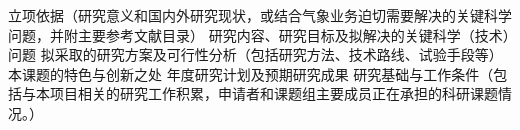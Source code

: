 \expandafter\def\csname XJSectionTitle1\endcsname{立项依据（研究意义和国内外研究现状，或结合气象业务迫切需要解决的关键科学问题，并附主要参考文献目录）}
\expandafter\def\csname XJSectionTitle2\endcsname{研究内容、研究目标及拟解决的关键科学（技术）问题}
\expandafter\def\csname XJSectionTitle3\endcsname{拟采取的研究方案及可行性分析（包括研究方法、技术路线、试验手段等）}
\expandafter\def\csname XJSectionTitle4\endcsname{本课题的特色与创新之处}
\expandafter\def\csname XJSectionTitle5\endcsname{年度研究计划及预期研究成果}
\expandafter\def\csname XJSectionTitle6\endcsname{研究基础与工作条件（包括与本项目相关的研究工作积累，申请者和课题组主要成员正在承担的科研课题情况。）}
\newcommand{\XJBibliography}[1]{\begingroup\raggedright#1\endgroup}
\newcommand{\XJResearchSection}[2]{%
  \ifnum#1=1
    \newgeometry{left=77bp,right=77.25bp,top=112bp,bottom=92bp}%
    \def\XJFrameTop{103.56}\def\XJFrameBottom{758.96}%
  \else
    \newgeometry{left=77bp,right=77.25bp,top=82bp,bottom=88bp}%
    \def\XJFrameTop{72.36}\def\XJFrameBottom{764.31}%
  \fi
  \AddToShipoutPictureBG{\begin{XJCanvas}\draw[line width=.48bp] (68.75,\XJFrameTop) rectangle (526.55,\XJFrameBottom);\end{XJCanvas}}%
  \ifnum#1=1\AddToShipoutPictureBG*{\begin{XJCanvas}\XJText{70.92}{92.69}{14.05}{\XJSong}{二、申请书正文}\XJText{177}{92.69}{12}{\XJSong}{（要求内容翔实、清晰，层次分明。可另附页）}\end{XJCanvas}}\fi
  \setcounter{section}{\numexpr#1-1\relax}\XJBodyFont\section{\csname XJSectionTitle#1\endcsname}#2\par\clearpage
  \ClearShipoutPictureBG\restoregeometry}
\newcommand{\XJLandscapePage}[1]{%
  \clearpage\setlength{\paperwidth}{841.9bp}\setlength{\paperheight}{595.3bp}%
  \pdfpagewidth=\paperwidth\pdfpageheight=\paperheight
  \special{papersize=841.9bp,595.3bp}%
  \XJFixedPage{7}{#1}%
  \setlength{\paperwidth}{595.3bp}\setlength{\paperheight}{841.9bp}%
  \pdfpagewidth=\paperwidth\pdfpageheight=\paperheight
  \special{papersize=595.3bp,841.9bp}}

